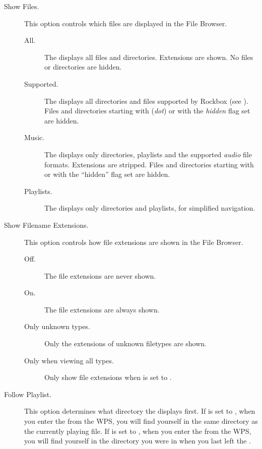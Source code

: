 \begin{description}
  
\item[Show Files.]
  This option controls which files are displayed in the File Browser.
  \begin{description}
  \item[All.] The  displays all files and directories.
    Extensions are shown. No files or directories are hidden.
  \item[Supported.] The  displays all directories and
    files supported by Rockbox (see ).
    Files and directories starting with  (\emph{dot}) or with the 
    \emph{hidden} flag set are hidden.
  \item[Music.] The  displays only directories, playlists and
    the supported \emph{audio} file formats. Extensions are stripped. Files and
    directories starting with  or with the ``hidden'' flag set are
    hidden.
  \item[Playlists.] The  displays only directories and playlists,
    for simplified navigation.
  \end{description}

\item[Show Filename Extensions.]
  This option controls how file extensions are shown in the File Browser.
  \begin{description}
  \item[Off.] The file extensions are never shown.
  \item[On.] The file extensions are always shown.
  \item[Only unknown types.] Only the extensions of unknown filetypes are shown.
  \item[Only when viewing all types.] Only show file extensions when
       is set to .
  \end{description}
  
\item[Follow Playlist.] 
  This option determines what directory the  displays
  first. If  is set to , when you enter
  the  from the WPS, you will find yourself in the same
  directory as the currently playing file. If  is set
  to , when you enter the  from the WPS, you
  will find yourself in the directory you were in when you last left the
  .


\end{description}
